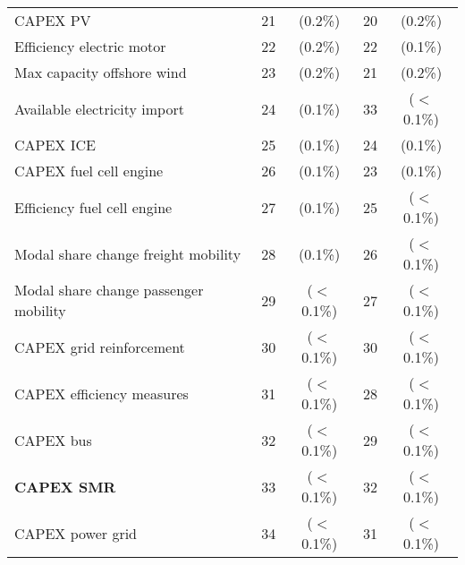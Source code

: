 \begin{table}[htbp!]
\begin{tabular}{l c c|c c}
CAPEX PV & 21 & (0.2\%) & 20 & (0.2\%) \\
Efficiency electric motor & 22 & (0.2\%) & 22 & (0.1\%)\\
Max capacity offshore wind & 23 & (0.2\%) & 21 & (0.2\%) \\
Available electricity import & 24 & (0.1\%) & 33 & ($<$0.1\%) \\
CAPEX ICE & 25 & (0.1\%) & 24 & (0.1\%)\\
CAPEX fuel cell engine & 26 & (0.1\%) & 23 & (0.1\%) \\
Efficiency fuel cell engine & 27 & (0.1\%) & 25 & ($<$0.1\%) \\
Modal share change freight mobility & 28 & (0.1\%) & 26 & ($<$0.1\%) \\
Modal share change passenger mobility & 29 & ($<$0.1\%) & 27 & ($<$0.1\%) \\
CAPEX grid reinforcement & 30 & ($<$0.1\%) & 30 & ($<$0.1\%) \\
CAPEX efficiency measures & 31 & ($<$0.1\%) & 28 & ($<$0.1\%) \\
CAPEX bus & 32 &($<$0.1\%)  & 29 & ($<$0.1\%) \\
\textbf{CAPEX \gls{SMR}} & 33 & ($<$0.1\%)  & 32 & ($<$0.1\%) \\
CAPEX power grid & 34 & ($<$0.1\%) & 31 & ($<$0.1\%) \\
\bottomrule							

\end{tabular}
\end{table}





